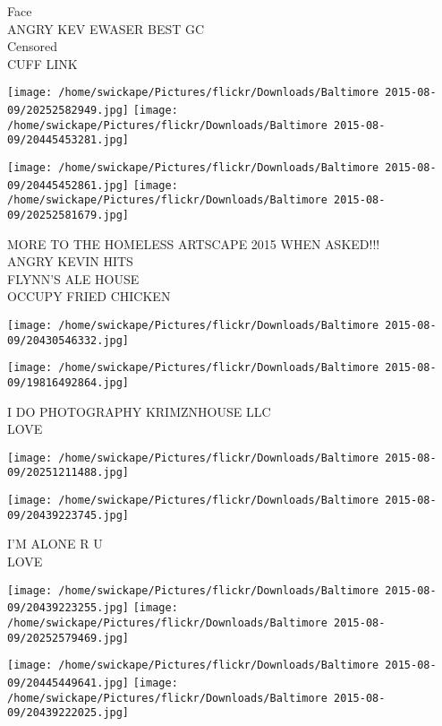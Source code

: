 \documentclass[10pt,letterpaper]{article}
\begin{document}
Face\\
ANGRY KEV EWASER BEST GC\\
Censored\\
CUFF LINK\\
\pagebreak

\texttt{[image: /home/swickape/Pictures/flickr/Downloads/Baltimore 2015-08-09/20252582949.jpg]}
\texttt{[image: /home/swickape/Pictures/flickr/Downloads/Baltimore 2015-08-09/20445453281.jpg]}

\texttt{[image: /home/swickape/Pictures/flickr/Downloads/Baltimore 2015-08-09/20445452861.jpg]}
\texttt{[image: /home/swickape/Pictures/flickr/Downloads/Baltimore 2015-08-09/20252581679.jpg]}

MORE TO THE HOMELESS ARTSCAPE 2015 WHEN ASKED!!!\\
ANGRY KEVIN HITS\\
FLYNN'S ALE HOUSE\\
OCCUPY FRIED CHICKEN\\
\pagebreak

\texttt{[image: /home/swickape/Pictures/flickr/Downloads/Baltimore 2015-08-09/20430546332.jpg]}

\vspace{0.25in}
\texttt{[image: /home/swickape/Pictures/flickr/Downloads/Baltimore 2015-08-09/19816492864.jpg]}

I DO PHOTOGRAPHY KRIMZNHOUSE LLC\\
LOVE\\
\pagebreak

\texttt{[image: /home/swickape/Pictures/flickr/Downloads/Baltimore 2015-08-09/20251211488.jpg]}

\vspace{0.25in}
\texttt{[image: /home/swickape/Pictures/flickr/Downloads/Baltimore 2015-08-09/20439223745.jpg]}

I'M ALONE R U\\
LOVE\\
\pagebreak

\texttt{[image: /home/swickape/Pictures/flickr/Downloads/Baltimore 2015-08-09/20439223255.jpg]}
\texttt{[image: /home/swickape/Pictures/flickr/Downloads/Baltimore 2015-08-09/20252579469.jpg]}

\texttt{[image: /home/swickape/Pictures/flickr/Downloads/Baltimore 2015-08-09/20445449641.jpg]}
\texttt{[image: /home/swickape/Pictures/flickr/Downloads/Baltimore 2015-08-09/20439222025.jpg]}
\end{document}
